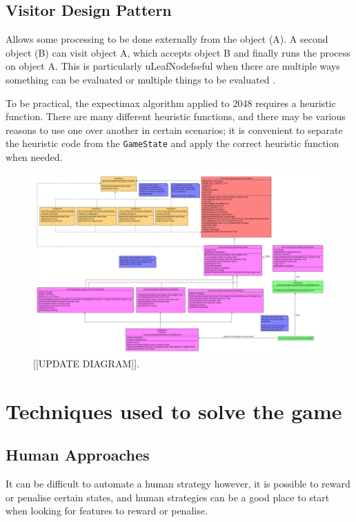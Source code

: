 \documentclass{article}
\begin{document}
\subsection{Visitor Design Pattern}
\label{subsec:visitor}
Allows some processing to be done externally from the object (A). A second object (B) can visit object A, which accepts object B and finally runs the process on object A.  This is particularly uLeafNodefseful when there are multiple ways something can be evaluated or multiple things to be evaluated \cite{CS2800_behavioural}.

To be practical, the expectimax algorithm applied to 2048 requires a heuristic function. There are many different heuristic functions, and there may be various reasons to use one over another in certain scenarios; it is convenient to separate the heuristic code from the \texttt{GameState} and apply the correct heuristic function when needed.

\begin{landscape}
\begin{figure}
    \centering
    \includegraphics[width=1.5\textwidth]{algorithm_uml.png}
    \caption{[[UPDATE DIAGRAM]].}
    \label{fig:alg_uml}
\end{figure}
\end{landscape}
\section{Techniques used to solve the game}
\label{sec:techniques}

\subsection{Human Approaches}
\label{subsec:human_techniques}
It can be difficult to automate a human strategy however, it is possible to reward or penalise certain states, and human strategies can be a good place to start when looking for features to reward or penalise.
\end{document}
